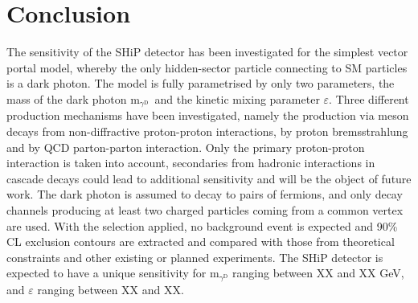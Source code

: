 \documentclass[12pt,a4paper]{article}
\newcommand{\mathDP}{\gamma^{\mathrm{D}}\ }
\newcommand{\mDP}{m$_{\mathDP}$}
\begin{document}
\section{Conclusion}
\label{sec:concl}


The sensitivity of the SHiP detector has been investigated for the
simplest vector portal model, whereby the only hidden-sector particle
connecting to SM particles is a dark photon. The model is fully
parametrised by only two parameters, the mass of the dark photon \mDP
and the kinetic mixing parameter $\varepsilon$. Three different
production mechanisms have been investigated, namely the production
via meson decays from non-diffractive proton-proton interactions, by
proton bremsstrahlung and by QCD parton-parton interaction. Only the
primary proton-proton interaction is taken into account, secondaries
from hadronic interactions in cascade decays could lead to additional
sensitivity and will be the object of future work. The dark photon is
assumed to decay to pairs of fermions, and only decay channels
producing at least two charged particles coming from a common vertex
are used. With the selection applied, no background event is expected
and 90\% CL exclusion contours are extracted and compared with those
from theoretical constraints and other existing or planned
experiments. The SHiP detector is expected to have a unique
sensitivity for m$_{\gamma^{\mathrm{D}}}$ ranging between XX and XX
GeV, and $\varepsilon$ ranging between XX and XX.



\cleardoublepage


\end{document}
